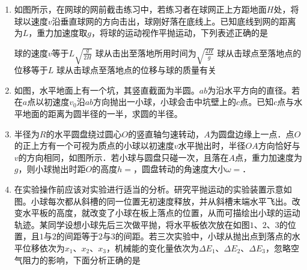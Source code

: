 \begin{enumerate}[leftmargin=0em]
\item 
{}
如图所示，在网球的网前截击练习中，若练习者在球网正上方距地面$ H $处，将球以速度$ v $沿垂直球网的方向击出，球刚好落在底线上。已知底线到网的距离为$ L $，重力加速度取$ g $，将球的运动视作平抛运动，下列表述正确的是  
\begin{figure}[h!]
\centering

\end{figure}

\fourchoices
{球的速度$ v $等于$L \sqrt { \frac { g } { 2 H } }$}
{球从击出至落地所用时间为$\sqrt { \frac { 2 H } { g } }$}
{球从击球点至落地点的位移等于$ L $}
{球从击球点至落地点的位移与球的质量有关}




\item 
{}
如图，水平地面上有一个坑，其竖直截面为半圆。$ ab $为沿水平方向的直径。若在$ a $点以初速度$ v_{0} $沿$ ab $方向抛出一小球，小球会击中坑壁上的$ c $点。已知$ c $点与水平地面的距离为圆半径的一半，求圆的半径。
\begin{figure}[h!]
\flushright

\end{figure}



\item 
{}
半径为$ R $的水平圆盘绕过圆心$ O $的竖直轴匀速转动，$ A $为圆盘边缘上一点．点$ O $的正上方有一个可视为质点的小球以初速度$ v $水平抛出时，半径$ OA $方向恰好与$ v $的方向相同，如图所示．若小球与圆盘只碰一次，且落在$ A $点，重力加速度为$ g $，则小球抛出时距$ O $的高度$ h= $，圆盘转动的角速度大小$ \omega = $． 
\begin{figure}[h!]
\centering

\end{figure}



\item 
{}
在实验操作前应该对实验进行适当的分析。研究平抛运动的实验装置示意如图。小球每次都从斜槽的同一位置无初速度释放，并从斜槽末端水平飞出。改变水平板的高度，就改变了小球在板上落点的位置，从而可描绘出小球的运动轨迹。某同学设想小球先后三次做平抛，将水平板依次放在如图$ 1 $、$ 2 $、$ 3 $的位置，且$ 1 $与$ 2 $的间距等于$ 2 $与$ 3 $的间距。若三次实验中，小球从抛出点到落点的水平位移依次为$ x_{1} $、$ x_{2} $、$ x_{3} $，机械能的变化量依次为$ \Delta E_{1} $、$ \Delta E_{2} $、$ \Delta E_3 $，忽略空气阻力的影响，下面分析正确的是  
\begin{figure}[h!]
\centering

\end{figure}


\end{enumerate}
